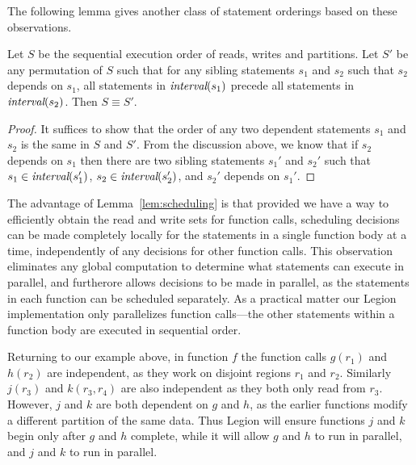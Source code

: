 The following lemma gives another class of statement orderings based on these observations.
\begin{lemma}
\rm
\label{lem:scheduling}
Let $S$ be the sequential execution order of reads, writes and partitions.  Let $S'$ be any permutation of $S$ such that
for any sibling statements $s_1$ and $s_2$ such that $s_2$ depends on $s_1$, all statements in $\mbox{\em interval}(s_1)$ precede
all statements in $\mbox{\em interval}(s_2)$.  Then $S \equiv S'$.
\end{lemma}
\begin{proof}
It suffices to show that the order of any two dependent statements $s_1$ and $s_2$ is the same in $S$ and $S'$.
From the discussion above, we know that if $s_2$ depends on $s_1$ then there are two sibling statements $s_1'$ and $s_2'$
such that $s_1 \in \mbox{\em interval}(s_1')$, $s_2 \in \mbox{\em interval}(s_2')$, and $s_2'$ depends
on $s_1'$.
\end{proof}
The advantage of Lemma~\ref{lem:scheduling} is that provided we have
a way to efficiently obtain the read and write sets for function calls, scheduling
decisions can be made completely locally for the statements in a
single function body at a time, independently of any decisions for
other function calls.  This observation eliminates any global
computation to determine what statements can execute in parallel, and
furtherore allows decisions to be made in parallel, as the statements
in each function can be scheduled separately.  As a practical matter
our Legion implementation only parallelizes function calls---the other
statements within a function body are executed in sequential
order.

Returning to our example above, in function $f$ the function calls
$g(r_1)$ and $h(r_2)$ are independent, as they work on disjoint
regions $r_1$ and $r_2$.  Similarly $j(r_3)$ and $k(r_3,r_4)$ are
also independent as they both only read from $r_3$.  However, $j$ and $k$
are both dependent on $g$ and $h$, as the earlier functions modify a different
partition of the same data.  Thus Legion will ensure functions $j$ and $k$
begin only after $g$ and $h$ complete, while it will allow $g$ and $h$
to run in parallel, and $j$ and $k$ to run in parallel.






   














